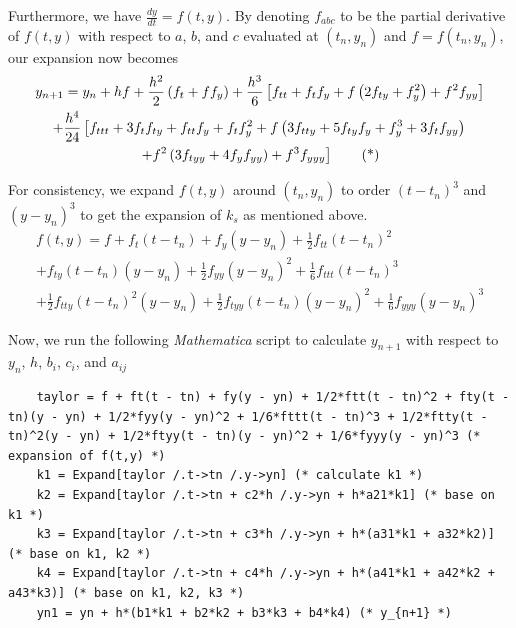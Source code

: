 \documentclass[a4paper]{article}
\numberwithin{equation}{section}
\begin{document}
Furthermore, we have \( \frac{dy}{dt} = f(t,y) \). By denoting \( f_{abc} \) to be the partial derivative of \( f(t,y) \) with respect to \( a \), \( b \), and \( c \) evaluated at \( (t_n, y_n) \) and \( f = f(t_n, y_n) \), our expansion now becomes
\begin{multline*}
  y_{n+1} = y_n + hf + \frac{h^2}{2}\left(f_t + f f_y\right) + \frac{h^3}{6}\left[f_{tt} + f_t f_y + f\left(2f_{ty} + f_y^2\right) + f^2 f_{yy}\right] \\
  + \frac{h^4}{24}\left[f_{ttt} + 3f_t f_{ty} + f_{tt} f_y + f_t f_y^2 + f\left(3f_{tty} + 5f_{ty} f_y + f_y^3 + 3f_t f_{yy}\right)\right.     \\
    \left.+ f^2\left(3f_{tyy} + 4f_y f_{yy}\right) + f^3 f_{yyy}\vphantom{f_y^3}\right] \tag{*}
\end{multline*}

For consistency, we expand \( f(t,y) \) around \( (t_n, y_n) \) to order \( {(t-t_n)}^3 \) and \( {(y-y_n)}^3 \) to get the expansion of \( k_s \) as mentioned above.
\begin{multline*}
  f(t,y) = f + f_t(t-t_n) + f_y(y-y_n) + \frac{1}{2}f_{tt}{(t-t_n)}^2 \\
  + f_{ty}(t-t_n)(y-y_n) + \frac{1}{2}f_{yy}{(y-y_n)}^2 + \frac{1}{6}f_{ttt}{(t-t_n)}^3 \\
  + \frac{1}{2}f_{tty}{(t-t_n)}^2(y-y_n) + \frac{1}{2}f_{tyy}(t-t_n){(y-y_n)}^2 + \frac{1}{6}f_{yyy}{(y-y_n)}^3
\end{multline*}

Now, we run the following \textit{Mathematica} script to calculate \( y_{n+1} \) with respect to \( y_n \), \( h \), \( b_i \), \( c_i \), and \( a_{ij} \)
\begin{mdframed}[leftline=false,rightline=false,backgroundcolor=magenta!10,nobreak=true]
  \begin{verbatim}
    taylor = f + ft(t - tn) + fy(y - yn) + 1/2*ftt(t - tn)^2 + fty(t - tn)(y - yn) + 1/2*fyy(y - yn)^2 + 1/6*fttt(t - tn)^3 + 1/2*ftty(t - tn)^2(y - yn) + 1/2*ftyy(t - tn)(y - yn)^2 + 1/6*fyyy(y - yn)^3 (* expansion of f(t,y) *)
    k1 = Expand[taylor /.t->tn /.y->yn] (* calculate k1 *)
    k2 = Expand[taylor /.t->tn + c2*h /.y->yn + h*a21*k1] (* base on k1 *)
    k3 = Expand[taylor /.t->tn + c3*h /.y->yn + h*(a31*k1 + a32*k2)] (* base on k1, k2 *)
    k4 = Expand[taylor /.t->tn + c4*h /.y->yn + h*(a41*k1 + a42*k2 + a43*k3)] (* base on k1, k2, k3 *)
    yn1 = yn + h*(b1*k1 + b2*k2 + b3*k3 + b4*k4) (* y_{n+1} *)
  \end{verbatim}
\end{mdframed}
\end{document}

